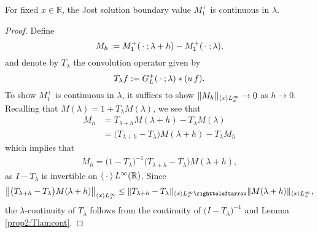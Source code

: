 \documentclass[../dissertation.tex]{subfiles}
\begin{document}
\begin{lma}\label{lma4:Mlamcont}
	For fixed $x\in \mathbb R$, the Jost solution boundary value $M_1^+$ is continuous 
	in $\lambda$.
\end{lma}
\begin{proof}
	Define
	\[
		M_h:= M_1^+(\kern 0.5ex \cdot \kern 0.5ex; \lambda +h) - M_1^+(\kern 0.5ex \cdot \kern 0.5ex; \lambda),
 	\]
 	and denote by $T_\lambda$ the convolution operator given by 
 	\[
 		T_\lambda f := G_L^+(\kern 0.5ex \cdot \kern 0.5ex; \lambda) * (u\, f).
 	\]
 	To show $M_1^+$ is continuous in $\lambda$, it suffices to show 
 	$\|M_h\|_{\left\langle x \right\rangle L_x^\infty} \to 0$ as $h \to 0$.
 	Recalling that $M(\lambda) = 1+ T_\lambda M(\lambda)$, we see that 
 	\begin{align*}
 		M_h 
 			&= T_{\lambda+h}M(\lambda+h) - T_{\lambda} M(\lambda) \\
 			&= \big(T_{\lambda+h} - T_\lambda\big) M(\lambda+h) 
 				- T_\lambda M_h
 	\end{align*}
 	which implies that
 	\begin{align}
 		M_h 
 			= 
 				\big(1-T_{\lambda}\big)^{-1} 
 				\big(T_{\lambda+h} - T_\lambda\big) M(\lambda+h),
 	\end{align}
 	as $I - T_\lambda$ is invertible on $\left\langle \kern 0.5ex \cdot \kern 0.5ex \right\rangle L^\infty(\mathbb R)$.
 	Since
 	\[
 		\left\|
 			\big(T_{\lambda+h} - T_\lambda\big)M(\lambda+h)
 		\right\|_{\inn{x}L_x^\infty}
 			\leq \|T_{\lambda+h} - T_\lambda\|_{\inn{x}L_x^\infty\toitself}
 					\|M(\lambda+h)\|_{\inn{x}L_x^\infty},
 	\]
 	the $\lambda$-continuity of $T_\lambda$ follows from the continuity of 
 	$\big(I - T_\lambda\big)^{-1}$ and Lemma \ref{prop2:Tlamcont}.
\end{proof}
\end{document}
